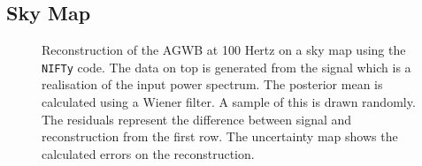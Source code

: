 \subsection{Sky Map}
\begin{figure}[h]
    \centering
    \newline
    \vspace{-1cm}
    \caption{Reconstruction of the AGWB at 100 Hertz on a sky map using the {\tt NIFTy} code. The data on top is generated from the signal which is a realisation of the input power spectrum. The posterior mean is calculated using a Wiener filter. A sample of this is drawn randomly. The residuals represent the difference between signal and reconstruction from the first row. The uncertainty map shows the calculated errors on the reconstruction.}
    \label{sky_maps_100}
\end{figure}

